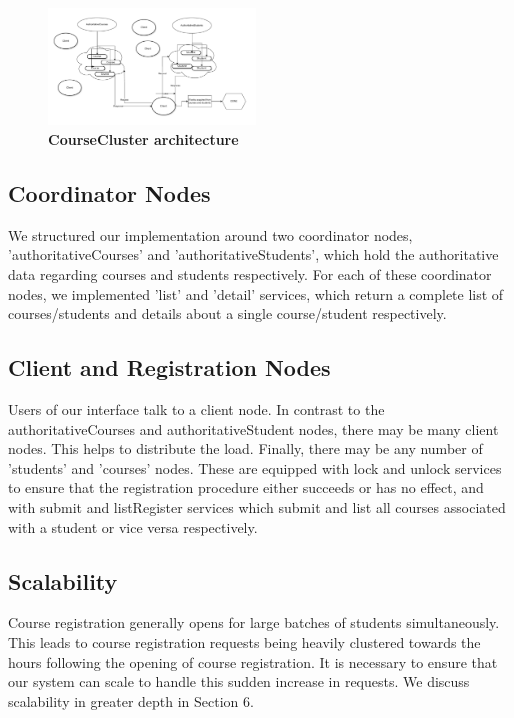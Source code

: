 \documentclass[sigplan, screen, 10pt]{acmart}
\begin{document}
\begin{figure}[t]
  \centering
  \includegraphics[width=0.49\textwidth]{./figs/overview.pdf}
  \caption{
    \textbf{CourseCluster architecture}
  }
  \vspace{-18pt}
  \label{fig:overview}
\end{figure}

\subsection{Coordinator Nodes}
We structured our implementation around two coordinator nodes, 'authoritativeCourses' and 'authoritativeStudents', which hold the authoritative data regarding courses and students respectively. For each of these coordinator nodes, we implemented 'list' and 'detail' services, which return a complete list of courses/students and details about a single course/student respectively.

\subsection{Client and Registration Nodes}
Users of our interface talk to a client node. In contrast to the authoritativeCourses and authoritativeStudent nodes, there may be many client nodes. This helps to distribute the load. Finally, there may be any number of 'students' and 'courses' nodes. These are equipped with lock and unlock services to ensure that the registration procedure either succeeds or has no effect, and with submit and listRegister services which submit and list all courses associated with a student or vice versa respectively.

\subsection{Scalability}
Course registration generally opens for large batches of students simultaneously. This leads to course registration requests being heavily clustered towards the hours following the opening of course registration. It is necessary to ensure that our system can scale to handle this sudden increase in requests. We discuss scalability in greater depth in Section 6.
\end{document}
